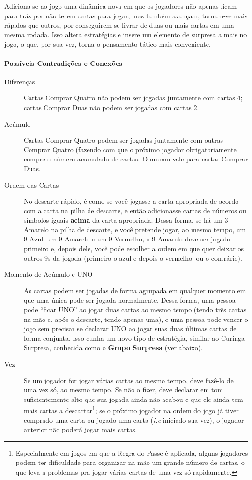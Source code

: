 Adiciona-se ao jogo uma dinâmica nova em que os jogadores não apenas ficam para trás por não terem cartas para jogar, mas também avançam, tornam-se mais rápidos que outros, por conseguirem se livrar de duas ou mais cartas em uma mesma rodada. Isso altera estratégias e insere um elemento de surpresa a mais no jogo, o que, por sua vez, torna o pensamento tático mais conveniente. 

\paragraph{Possíveis Contradições e Conexões}

\begin{description}
\item[Diferenças]{Cartas Comprar Quatro não podem ser jogadas juntamente com cartas 4; cartas Comprar Duas não podem ser jogadas com cartas 2.}
\item[Acúmulo]{Cartas Comprar Quatro podem ser jogadas juntamente com outras Comprar Quatro (fazendo com que o próximo jogador obrigatoriamente compre o número acumulado de cartas. O mesmo vale para cartas Comprar Duas.}
\item[Ordem das Cartas]{No descarte rápido, é como se você jogasse a carta apropriada de acordo com a carta na pilha de descarte, e então adicionasse cartas de números ou símbolos iguais \textbf{acima} da carta apropriada. Dessa forma, se há um 3 Amarelo na pilha de descarte, e você pretende jogar, ao mesmo tempo, um 9 Azul, um 9 Amarelo e um 9 Vermelho, o 9 Amarelo deve ser jogado primeiro e, depois dele, você pode escolher a ordem em que quer deixar os outros 9s da jogada (primeiro o azul e depois o vermelho, ou o contrário).}
\item[Momento de Acúmulo e UNO]{As cartas podem ser jogadas de forma agrupada em qualquer momento em que uma única pode ser jogada normalmente. Dessa forma, uma pessoa pode ``ficar UNO'' ao jogar duas cartas ao mesmo tempo (tendo três cartas na mão e, após o descarte, tendo apenas uma), e uma pessoa pode vencer o jogo sem precisar se declarar UNO ao jogar suas duas últimas cartas de forma conjunta. Isso cunha um novo tipo de estratégia, similar ao Curinga Surpresa, conhecida como o \textbf{Grupo Surpresa} (ver abaixo).}
\item[Vez]{Se um jogador for jogar várias cartas ao mesmo tempo, deve fazê-lo de uma vez só, ao mesmo tempo. Se não o fizer, deve declarar em tom suficientemente alto que sua jogada ainda não acabou e que ele ainda tem mais cartas a descartar\footnote{Especialmente em jogos em que a Regra do Passe é aplicada, alguns jogadores podem ter dificuldade para organizar na mão um grande número de cartas, o que leva a problemas pra jogar várias cartas de uma vez só rapidamente.}; se o próximo jogador na ordem do jogo já tiver comprado uma carta ou jogado uma carta (\emph{i.e} iniciado sua vez), o jogador anterior não poderá jogar mais cartas.}

\end{description}
